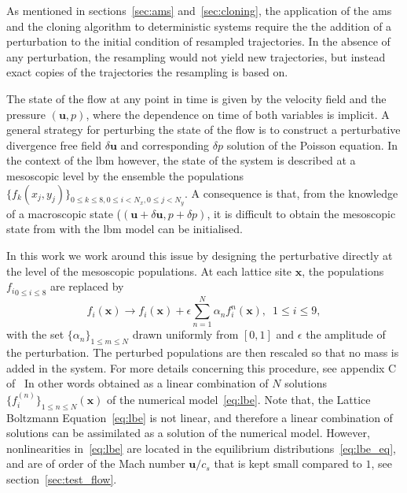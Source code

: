 As mentioned in sections~\ref{sec:ams} and~\ref{sec:cloning}, the application of the \ac{ams} and the cloning algorithm to deterministic systems require the the addition of a perturbation to the initial condition of
resampled trajectories.
In the absence of any perturbation, the resampling would not yield new trajectories, but instead exact copies of the trajectories the resampling is based on.

The state of the flow at any point in time is given by the velocity field and the pressure $(\mathbf{u}, p)$, where the dependence on time of both variables is implicit.
A general strategy for perturbing the state of the flow is to construct a perturbative divergence free field $\delta \mathbf{u}$ and corresponding $\delta p$ solution of the
Poisson equation.
In the context of the \ac{lbm} however, the state of the system is described at a mesoscopic level by the ensemble the populations $\{f_k(x_j, y_j)\}_{0\le k \le 8, 0 \le i <N_x, 0 \le j < N_y}$.
A consequence is that, from the knowledge of a macroscopic state ($(\mathbf{u}+\delta \mathbf{u}, p + \delta p)$, it is difficult to obtain the mesoscopic state from with the \ac{lbm} model can be initialised.

In this work we work around this issue by designing the perturbative directly at the level of the mesoscopic populations.
At each lattice site $\mathbf{x}$, the populations ${f_i}_{0\le i \le 8}$ are replaced by
\begin{equation}
  f_{i}(\mathbf{x}) \longrightarrow f_i(\mathbf{x}) + \epsilon \sum_{n=1}^{N} \alpha_{n}f_{i}^{n}(\mathbf{x}), \,\,\, 1\leq i \leq 9,
  \label{eq:perturb_pop}
\end{equation}
with the set $\{\alpha_n\}_{1\leq m \leq N}$ drawn uniformly from $[0,1]$ and $\epsilon$ the amplitude of the perturbation. The perturbed populations are then rescaled so that no mass is added in the system.
For more details concerning this procedure, see appendix C of~\cite{lestang:tel-01974316}
In other words obtained as a linear combination of $N$ solutions $\{f_i^{(n)}\}_{1\le n \le N}(\mathbf{x})$ of the numerical model~\eqref{eq:lbe}.
Note that, the Lattice Boltzmann Equation~\eqref{eq:lbe} is not linear, and therefore a linear combination of solutions can be assimilated as a solution of the numerical model.
However, nonlinearities in~\eqref{eq:lbe} are located in the equilibrium distributions~\eqref{eq:lbe_eq}, and are of order of the Mach number $\mathbf{u}/c_s$ that is kept small compared to $1$, see section~\ref{sec:test_flow}.

